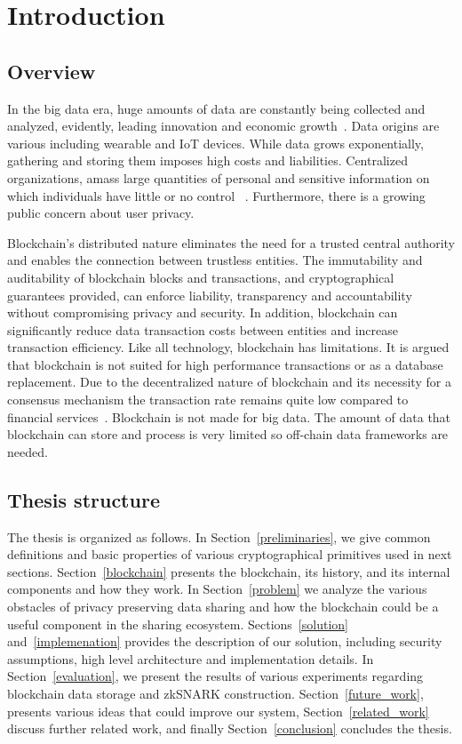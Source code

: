 \chapter{Introduction}
\label{introduction}

\section{Overview}
\label{introduction:overview}

In the big data era, huge amounts of data are constantly being collected and analyzed, evidently, leading innovation and
economic growth~\cite{10.1109/SPW.2015.27}. Data origins are various including wearable and IoT devices.
While data grows exponentially, gathering and storing them imposes high costs and liabilities.
Centralized organizations, amass large quantities of personal and sensitive information on which individuals have little or no control ~\cite{10.1109/SPW.2015.27}.
Furthermore, there is a growing public concern about user privacy.

Blockchain’s distributed nature eliminates the need for a trusted central authority and enables the connection between trustless entities.
The immutability and auditability of blockchain blocks and transactions, and cryptographical guarantees provided, can enforce liability, transparency and accountability without compromising privacy and security.
In addition, blockchain can significantly reduce data transaction costs between entities and increase transaction efficiency.
Like all technology, blockchain has limitations. It is argued that blockchain is not suited for high performance transactions or as a database replacement.
Due to the decentralized nature of blockchain and its necessity for a consensus mechanism the transaction rate remains quite low compared to financial services~\cite{Sompolinsky2015,Zohar:2015:BUH:2817191.2701411}.
Blockchain is not made for big data. The amount of data that blockchain can store and process is very limited so off-chain data frameworks are needed.

\section{Thesis structure}
\label{introduction:structure}

The thesis is organized as follows. In Section~\ref{preliminaries}, we give common definitions and basic properties of various cryptographical primitives used in next sections. Section~\ref{blockchain} presents the blockchain, its history, and its internal components and how they work. In Section~\ref{problem} we analyze the various obstacles of privacy preserving data sharing and how the blockchain could be a useful component in the sharing ecosystem. Sections~\ref{solution} and~\ref{implemenation} provides the description of our solution, including security assumptions, high level architecture and implementation details. In Section~\ref{evaluation}, we present the results of various experiments regarding blockchain data storage and zkSNARK construction. Section~\ref{future_work}, presents various ideas that could improve our system, Section~\ref{related_work} discuss further related work, and finally Section~\ref{conclusion} concludes the thesis.
